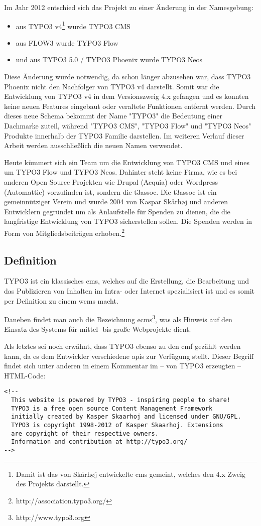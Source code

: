 Im Jahr 2012 entschied sich das Projekt zu einer Änderung in der Namesgebung:
\begin{itemize}
  \item aus TYPO3 v4\footnote{Damit ist das von Skårhøj entwickelte \gls{cms} gemeint, welches den 4.x Zweig des Projekts darstellt.} wurde TYPO3 CMS
  \item aus FLOW3 wurde TYPO3 Flow
  \item und aus TYPO3 5.0 / TYPO3 Phoenix wurde TYPO3 Neos
\end{itemize}

Diese Änderung wurde notwendig, da schon länger abzusehen war, dass TYPO3 Phoenix nicht den Nachfolger von TYPO3 v4 darstellt. Somit war die Entwicklung von TYPO3 v4 in dem Versionszweig 4.x gefangen und es konnten keine neuen Features eingebaut oder veraltete Funktionen entfernt werden. Durch dieses neue Schema bekommt der Name "TYPO3" die Bedeutung einer Dachmarke zuteil, während "TYPO3 CMS", "TYPO3 Flow" und "TYPO3 Neos" Produkte innerhalb der TYPO3 Familie darstellen. Im weiteren Verlauf dieser Arbeit werden ausschließlich die neuen Namen verwendet.

Heute kümmert sich ein Team um die Entwicklung von TYPO3 CMS und eines um TYPO3 Flow und TYPO3 Neos. Dahinter steht keine Firma, wie es bei anderen Open Source Projekten wie Drupal (Acquia) oder Wordpress (Automattic) vorzufinden ist, sondern die \gls{t3assoc}. Die \gls{t3assoc} ist ein gemeinnütziger Verein und wurde 2004 von Kaspar Skårhøj und anderen Entwicklern gegründet um als Anlaufstelle für Spenden zu dienen, die die langfristige Entwicklung von TYPO3 sicherstellen sollen. Die Spenden werden in Form von Mitgliedsbeiträgen erhoben.\footnote{http://association.typo3.org/}

\subsection{Definition}
TYPO3 ist ein klassisches \gls{cms}, welches auf die Erstellung, die Bearbeitung und das Publizieren von Inhalten im Intra- oder Internet spezialisiert ist und es somit per Definition zu einem \gls{wcms} macht.

Daneben findet man auch die Bezeichnung \gls{ecms}\footnote{http://www.typo3.org}, was als Hinweis auf den Einsatz des Systems für mittel- bis große Webprojekte dient.

Als letztes sei noch erwähnt, dass TYPO3 ebenso zu den \gls{cmf} gezählt werden kann, da es dem Entwickler verschiedene \gls{api}s zur Verfügung stellt. Dieser Begriff findet sich unter anderen in einem Kommentar im – von TYPO3 erzeugten – HTML-Code:
\begin{verbatim}
<!--
  This website is powered by TYPO3 - inspiring people to share!
  TYPO3 is a free open source Content Management Framework
  initially created by Kasper Skaarhoj and licensed under GNU/GPL.
  TYPO3 is copyright 1998-2012 of Kasper Skaarhoj. Extensions
  are copyright of their respective owners.
  Information and contribution at http://typo3.org/
-->
\end{verbatim}

